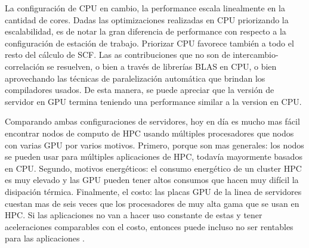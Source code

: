 La configuraci\'on de CPU en cambio, la performance escala linealmente en la cantidad de cores.
Dadas las optimizaciones realizadas en CPU priorizando la escalabilidad, es de notar la gran
diferencia de performance con respecto a la configuraci\'on de estaci\'on de trabajo. Priorizar CPU
favorece tambi\'en a todo el resto del c\'alculo de SCF. Las as contribuciones que no son
de intercambio-correlaci\'on se resuelven, o bien a trav\'es de librer\'ias BLAS en CPU, o bien
aprovechando las t\'ecnicas de paralelizaci\'on autom\'atica que brindan los compiladores usados. De
esta manera, se puede apreciar que la versi\'on de servidor en GPU termina teniendo una performance
similar a la version en CPU.

Comparando ambas configuraciones de servidores, hoy en d\'ia es mucho mas f\'acil encontrar
nodos de computo de HPC usando m\'ultiples procesadores que nodos con varias GPU por varios motivos.
Primero, porque son mas generales: los nodos se pueden usar para m\'ultiples aplicaciones de HPC,
todav\'ia mayormente basados en CPU. Segundo, motivos energ\'eticos: el consumo energ\'etico de un cluster
HPC es muy elevado y las GPU pueden tener altos consumos que hacen muy dif\'icil la disipaci\'on t\'ermica.
Finalmente, el costo: las placas GPU de la linea de servidores cuestan mas de seis veces que los
procesadores de muy alta gama que se usan en HPC. Si las aplicaciones no van a hacer uso constante
de estas y tener aceleraciones comparables con el costo, entonces puede incluso no ser rentables
para las aplicaciones .



